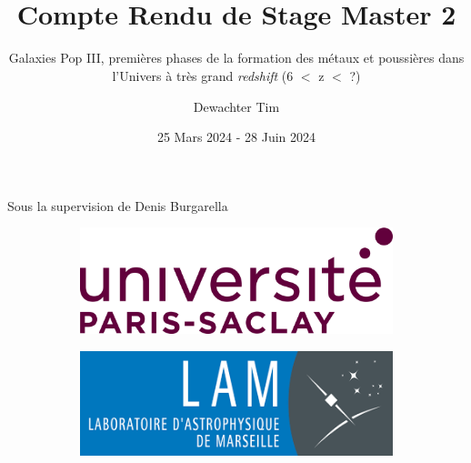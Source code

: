 \documentclass[12pt, a4paper]{article}
\title{\textbf{ \\{\Huge Compte Rendu de Stage Master 2}}}
\subtitle{Galaxies Pop III, premières phases de la formation des métaux et poussières dans l'Univers à très grand \textit{redshift} (6 $<$ z $<$ ?)}
\author{Dewachter Tim}
\date{25 Mars 2024 - 28 Juin 2024}
\begin{document}
\maketitle

\centerline{
Sous la supervision de Denis Burgarella
}

\begin{figure}
  \centering
     \begin{subfigure}[b]{0.3\textwidth}
         \centering
         \includegraphics[width=\textwidth]{assets/paris-saclay.png}
     \end{subfigure}
     \hfill
     \begin{subfigure}[b]{0.3\textwidth}
         \centering
         \includegraphics[width=\textwidth]{assets/lam.png}
     \end{subfigure}
\end{figure}
\end{document}
